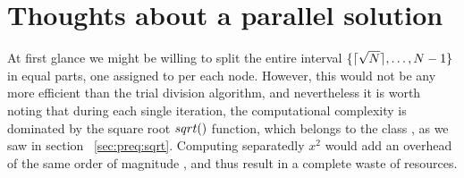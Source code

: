 \section{Thoughts about a parallel solution}

At first glance we might be willing to split the entire interval
$\{ \lceil\sqrt{N}\rceil, \ldots, N-1 \}$ in equal parts, one assigned to per each
node. However, this would not be any more efficient than the trial division
algorithm, and nevertheless it is worth noting that during each single iteration,
the computational complexity is dominated by the square root $\dsqrt$ function,
which belongs to the class , as we saw in section
~\ref{sec:preq:sqrt}. Computing separatedly $x^2$ would add an overhead of the
same order of magnitude , and thus result in a complete waste of
resources.
